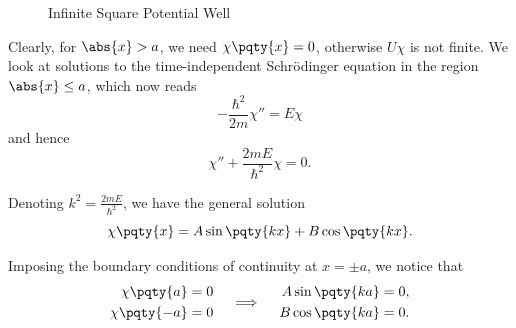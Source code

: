 \begin{figure}[ht]
    \centering
    \caption{Infinite Square Potential Well}
    \label{fig:infinite-well}%
\end{figure}

Clearly, for \(\abs{x} > a\), we need \(\chi\pqty{x} = 0\), otherwise \(U \chi\) is not finite. We look at solutions to the time-independent Schr\"{o}dinger equation in the region \(\abs{x} \leq a\), which now reads
\begin{equation}
    - \frac{\hbar^2}{2m} \chi'' = E \chi
\end{equation}
and hence
\begin{equation}
    \chi'' + \frac{2 m E}{\hbar^2} \chi = 0.
\end{equation}

Denoting \(k^2 = \frac{2 m E}{\hbar^2}\), we have the general solution
\begin{equation}
    \chi\pqty{x} = A \sin\pqty{k x} + B \cos\pqty{k x}.
\end{equation}

Imposing the boundary conditions of continuity at \(x = \pm a\), we notice that
\begin{equation}
    \begin{split}
        \chi\pqty{a} &= 0 \\
        \chi\pqty{-a} &= 0
    \end{split}
    \quad
    \implies
    \quad
    \begin{split}
        A \sin \pqty{ka} &= 0, \\
        B \cos \pqty{ka} &= 0.
    \end{split}
\end{equation}

